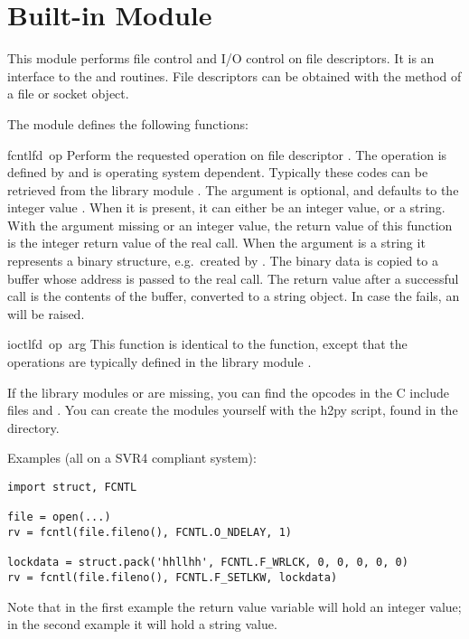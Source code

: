 \section{Built-in Module }

This module performs file control and I/O control on file descriptors.
It is an interface to the  and  \UNIX{} routines.
File descriptors can be obtained with the  method of a
file or socket object.

The module defines the following functions:

\renewcommand{\indexsubitem}{(in module struct)}

\begin{funcdesc}{fcntl}{fd\, op}
  Perform the requested operation on file descriptor .
  The operation is defined by  and is operating system
  dependent.  Typically these codes can be retrieved from the library
  module . The argument  is optional, and
  defaults to the integer value .  When
  it is present, it can either be an integer value, or a string.  With
  the argument missing or an integer value, the return value of this
  function is the integer return value of the real 
  call.  When the argument is a string it represents a binary
  structure, e.g.\ created by . The binary data is
  copied to a buffer whose address is passed to the real 
  call.  The return value after a successful call is the contents of
  the buffer, converted to a string object.  In case the
   fails, an  will be raised.
\end{funcdesc}

\begin{funcdesc}{ioctl}{fd\, op\, arg}
  This function is identical to the  function, except
  that the operations are typically defined in the library module
  .
\end{funcdesc}

If the library modules  or  are missing, you
can find the opcodes in the C include files  and
. You can create the modules yourself with the h2py
script, found in the  directory.

Examples (all on a SVR4 compliant system):

\bcode\begin{verbatim}
import struct, FCNTL

file = open(...)
rv = fcntl(file.fileno(), FCNTL.O_NDELAY, 1)

lockdata = struct.pack('hhllhh', FCNTL.F_WRLCK, 0, 0, 0, 0, 0)
rv = fcntl(file.fileno(), FCNTL.F_SETLKW, lockdata)
\end{verbatim}\ecode

Note that in the first example the return value variable  will
hold an integer value; in the second example it will hold a string
value.
